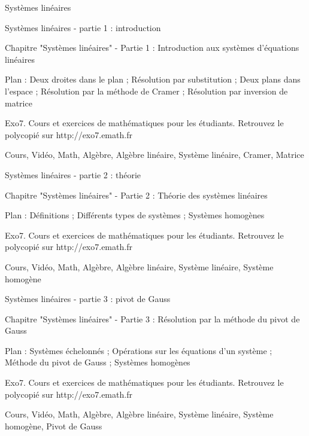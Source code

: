 
   Systèmes linéaires




Systèmes linéaires - partie 1 : introduction



Chapitre "Systèmes linéaires" - Partie 1 : Introduction aux systèmes d'équations linéaires

Plan : Deux droites dans le plan ; Résolution par substitution ; Deux plans dans l'espace ;
Résolution par la méthode de Cramer ; Résolution par inversion de matrice

Exo7. Cours et exercices de mathématiques pour les étudiants.
Retrouvez le polycopié sur http://exo7.emath.fr


Cours, Vidéo, Math, Algèbre, Algèbre linéaire, Système linéaire, Cramer, Matrice




Systèmes linéaires - partie 2 : théorie



Chapitre "Systèmes linéaires" - Partie 2 : Théorie des systèmes linéaires

Plan : Définitions ; Différents types de systèmes ; Systèmes homogènes

Exo7. Cours et exercices de mathématiques pour les étudiants.
Retrouvez le polycopié sur http://exo7.emath.fr


Cours, Vidéo, Math, Algèbre, Algèbre linéaire, Système linéaire, Système homogène




Systèmes linéaires - partie 3 : pivot de Gauss



Chapitre "Systèmes linéaires" - Partie 3 : Résolution par la méthode du pivot de Gauss

Plan : Systèmes échelonnés ; Opérations sur les équations d'un système ; 
Méthode du pivot de Gauss ; Systèmes homogènes

Exo7. Cours et exercices de mathématiques pour les étudiants.
Retrouvez le polycopié sur http://exo7.emath.fr


Cours, Vidéo, Math, Algèbre, Algèbre linéaire, Système linéaire, Système homogène,
Pivot de Gauss

